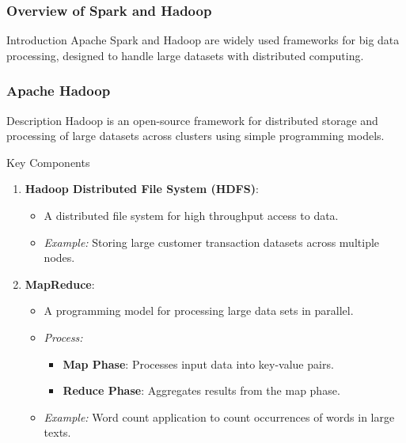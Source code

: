 \documentclass{beamer}
\begin{document}
\begin{frame}[fragile]
    \frametitle{Overview of Spark and Hadoop}
    \begin{block}{Introduction}
        Apache Spark and Hadoop are widely used frameworks for big data processing, designed to handle large datasets with distributed computing.
    \end{block}
\end{frame}

\begin{frame}[fragile]
    \frametitle{Apache Hadoop}
    \begin{block}{Description}
        Hadoop is an open-source framework for distributed storage and processing of large datasets across clusters using simple programming models.
    \end{block}

    \begin{block}{Key Components}
        \begin{enumerate}
            \item \textbf{Hadoop Distributed File System (HDFS)}:
                \begin{itemize}
                    \item A distributed file system for high throughput access to data.
                    \item \textit{Example:} Storing large customer transaction datasets across multiple nodes.
                \end{itemize}
            \item \textbf{MapReduce}:
                \begin{itemize}
                    \item A programming model for processing large data sets in parallel.
                    \item \textit{Process:}
                    \begin{itemize}
                        \item \textbf{Map Phase}: Processes input data into key-value pairs.
                        \item \textbf{Reduce Phase}: Aggregates results from the map phase.
                    \end{itemize}
                    \item \textit{Example:} Word count application to count occurrences of words in large texts.
                \end{itemize}
        \end{enumerate}
    \end{block}


\end{frame}
\end{document}
